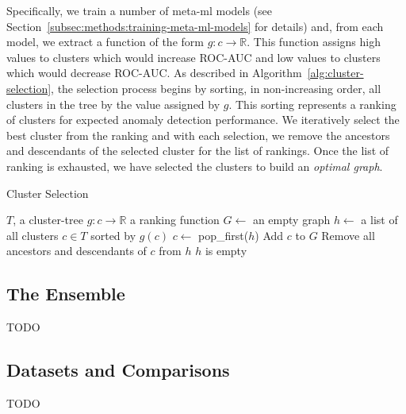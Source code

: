 Specifically, we train a number of meta-ml models (see Section~\ref{subsec:methods:training-meta-ml-models} for details) and, from each model, we extract a function of the form $g : c \rightarrow \mathbb{R}$.
This function assigns high values to clusters which would increase ROC-AUC and low values to clusters which would decrease ROC-AUC.
As described in Algorithm~\ref{alg:cluster-selection}, the selection process begins by sorting, in non-increasing order, all clusters in the tree by the value assigned by $g$.
This sorting represents a ranking of clusters for expected anomaly detection performance.
We iteratively select the best cluster from the ranking and with each selection, we remove the ancestors and descendants of the selected cluster for the list of rankings.
Once the list of ranking is exhausted, we have selected the clusters to build an \textit{optimal graph}.

\begin{algorithm}[h]
    \caption{Cluster Selection}
    \label{alg:cluster-selection}
\begin{algorithmic}[1]
    \REQUIRE $T$, a cluster-tree
    \REQUIRE $g : c \rightarrow \mathbb{R}$ a ranking function
    \STATE $G \gets$ an empty graph
    \STATE $h \gets$ a list of all clusters $c \in T$ sorted by $g(c)$
    \REPEAT
        \STATE $c \gets$ pop\_first($h$)
        \STATE Add $c$ to $G$
        \STATE Remove all ancestors and descendants of $c$ from $h$
    \UNTIL $h$ is empty
\end{algorithmic}
\end{algorithm}


\subsection{The Ensemble}
\label{subsec:methods:the-ensemble}
TODO


\subsection{Datasets and Comparisons}
\label{subsec:methods:datasets-and-comparisons}
TODO



